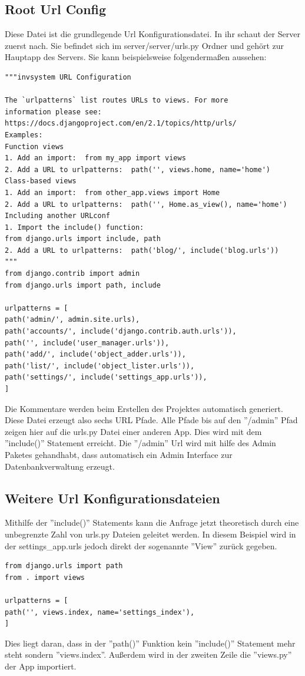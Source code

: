 \documentclass{article}
\begin{document}
\subsection{Root Url Config}
Diese Datei ist die grundlegende Url Konfigurationsdatei. In ihr schaut der Server zuerst nach. Sie befindet sich im server/server/urls.py Ordner und gehört zur Hauptapp des Servers. Sie kann beispielsweise folgendermaßen aussehen:
\begin{verbatim}
"""invsystem URL Configuration

The `urlpatterns` list routes URLs to views. For more
information please see:
https://docs.djangoproject.com/en/2.1/topics/http/urls/
Examples:
Function views
1. Add an import:  from my_app import views
2. Add a URL to urlpatterns:  path('', views.home, name='home')
Class-based views
1. Add an import:  from other_app.views import Home
2. Add a URL to urlpatterns:  path('', Home.as_view(), name='home')
Including another URLconf
1. Import the include() function: 
from django.urls import include, path
2. Add a URL to urlpatterns:  path('blog/', include('blog.urls'))
"""
from django.contrib import admin
from django.urls import path, include

urlpatterns = [
path('admin/', admin.site.urls),
path('accounts/', include('django.contrib.auth.urls')),
path('', include('user_manager.urls')),
path('add/', include('object_adder.urls')),
path('list/', include('object_lister.urls')),
path('settings/', include('settings_app.urls')),
]
\end{verbatim}
Die Kommentare werden beim Erstellen des Projektes automatisch generiert. Diese Datei erzeugt also sechs URL Pfade. Alle Pfade bis auf den ''/admin'' Pfad zeigen hier auf die urls.py Datei einer anderen App. Dies wird mit dem ''include()'' Statement erreicht. Die ''/admin'' Url wird mit hilfe des Admin Paketes gehandhabt, dass automatisch ein Admin Interface zur Datenbankverwaltung erzeugt. 
\subsection{Weitere Url Konfigurationsdateien}
Mithilfe der ''include()'' Statements kann die Anfrage jetzt theoretisch durch eine unbegrenzte Zahl von urls.py Dateien geleitet werden. In diesem Beispiel wird in der settings\_app.urls jedoch direkt der sogenannte ''View'' zurück gegeben.

\begin{verbatim}
from django.urls import path
from . import views

urlpatterns = [
path('', views.index, name='settings_index'),
]
\end{verbatim}
Dies liegt daran, dass in der ''path()'' Funktion kein ''include()'' Statement mehr steht sondern ''views.index''. Außerdem wird in der zweiten Zeile die ''views.py'' der App importiert.
\end{document}
